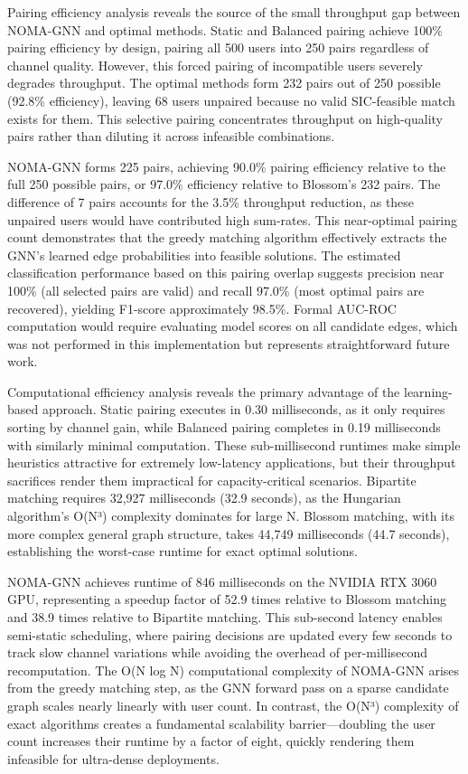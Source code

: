 Pairing efficiency analysis reveals the source of the small throughput gap between NOMA-GNN and optimal methods. Static and Balanced pairing achieve 100\% pairing efficiency by design, pairing all 500 users into 250 pairs regardless of channel quality. However, this forced pairing of incompatible users severely degrades throughput. The optimal methods form 232 pairs out of 250 possible (92.8\% efficiency), leaving 68 users unpaired because no valid SIC-feasible match exists for them. This selective pairing concentrates throughput on high-quality pairs rather than diluting it across infeasible combinations.

NOMA-GNN forms 225 pairs, achieving 90.0\% pairing efficiency relative to the full 250 possible pairs, or 97.0\% efficiency relative to Blossom's 232 pairs. The difference of 7 pairs accounts for the 3.5\% throughput reduction, as these unpaired users would have contributed high sum-rates. This near-optimal pairing count demonstrates that the greedy matching algorithm effectively extracts the GNN's learned edge probabilities into feasible solutions. The estimated classification performance based on this pairing overlap suggests precision near 100\% (all selected pairs are valid) and recall 97.0\% (most optimal pairs are recovered), yielding F1-score approximately 98.5\%. Formal AUC-ROC computation would require evaluating model scores on all candidate edges, which was not performed in this implementation but represents straightforward future work.

Computational efficiency analysis reveals the primary advantage of the learning-based approach. Static pairing executes in 0.30 milliseconds, as it only requires sorting by channel gain, while Balanced pairing completes in 0.19 milliseconds with similarly minimal computation. These sub-millisecond runtimes make simple heuristics attractive for extremely low-latency applications, but their throughput sacrifices render them impractical for capacity-critical scenarios. Bipartite matching requires 32,927 milliseconds (32.9 seconds), as the Hungarian algorithm's O(N³) complexity dominates for large N. Blossom matching, with its more complex general graph structure, takes 44,749 milliseconds (44.7 seconds), establishing the worst-case runtime for exact optimal solutions.

NOMA-GNN achieves runtime of 846 milliseconds on the NVIDIA RTX 3060 GPU, representing a speedup factor of 52.9 times relative to Blossom matching and 38.9 times relative to Bipartite matching. This sub-second latency enables semi-static scheduling, where pairing decisions are updated every few seconds to track slow channel variations while avoiding the overhead of per-millisecond recomputation. The O(N log N) computational complexity of NOMA-GNN arises from the greedy matching step, as the GNN forward pass on a sparse candidate graph scales nearly linearly with user count. In contrast, the O(N³) complexity of exact algorithms creates a fundamental scalability barrier—doubling the user count increases their runtime by a factor of eight, quickly rendering them infeasible for ultra-dense deployments.

